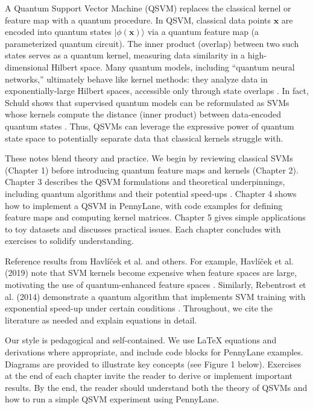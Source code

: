 A Quantum Support Vector Machine (QSVM) replaces the classical kernel or feature map with a quantum procedure.  In QSVM, classical data points $\mathbf{x}$ are encoded into quantum states $|\phi(\mathbf{x})\rangle$ via a quantum feature map (a parameterized quantum circuit).  The inner product (overlap) between two such states serves as a quantum kernel, measuring data similarity in a high-dimensional Hilbert space.  Many quantum models, including “quantum neural networks,” ultimately behave like kernel methods: they analyze data in exponentially-large Hilbert spaces, accessible only through state overlaps .  In fact, Schuld shows that supervised quantum models can be reformulated as SVMs whose kernels compute the distance (inner product) between data-encoded quantum states .  Thus, QSVMs can leverage the expressive power of quantum state space to potentially separate data that classical kernels struggle with.



These notes blend theory and practice.  We begin by reviewing classical SVMs (Chapter 1) before introducing quantum feature maps and kernels (Chapter 2).  Chapter 3 describes the QSVM formulations and theoretical underpinnings, including quantum algorithms and their potential speed-ups .  Chapter 4 shows how to implement a QSVM in PennyLane, with code examples for defining feature maps and computing kernel matrices.  Chapter 5 gives simple applications to toy datasets and discusses practical issues.  Each chapter concludes with exercises to solidify understanding.



Reference results from Havlíček et al. and others.  For example, Havlíček et al. (2019) note that SVM kernels become expensive when feature spaces are large, motivating the use of quantum-enhanced feature spaces .  Similarly, Rebentrost et al. (2014) demonstrate a quantum algorithm that implements SVM training with exponential speed-up under certain conditions .  Throughout, we cite the literature as needed and explain equations in detail.



Our style is pedagogical and self-contained.  We use LaTeX equations and derivations where appropriate, and include code blocks for PennyLane examples.  Diagrams are provided to illustrate key concepts (see Figure 1 below).  Exercises at the end of each chapter invite the reader to derive or implement important results.  By the end, the reader should understand both the theory of QSVMs and how to run a simple QSVM experiment using PennyLane.





